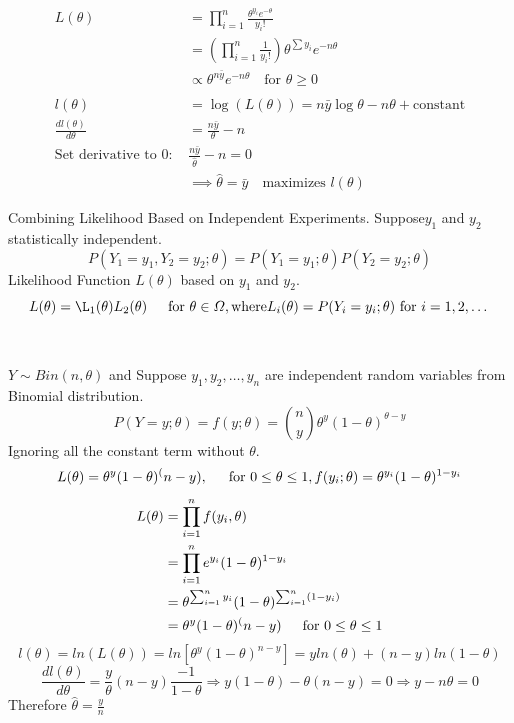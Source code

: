 \documentclass{article}
\begin{document}
\begin{align*}
    L(\theta) &= \prod_{i=1}^{n} \frac{\theta^{y_i} e^{-\theta}}{y_i!} \\
    &= \left( \prod_{i=1}^{n} \frac{1}{y_i!} \right) \theta^{\sum y_i} e^{-n\theta} \\
    &\propto \theta^{n\bar{y}} e^{-n\theta} \quad \text{for } \theta \ge 0 \\
    \\
    l(\theta) &= \log(L(\theta)) = n\bar{y}\log\theta - n\theta + \text{constant} \\
    \frac{d l(\theta)}{d\theta} &= \frac{n\bar{y}}{\theta} - n \\
    \text{Set derivative to 0: } & \frac{n\bar{y}}{\hat{\theta}} - n = 0 \\
    &\implies \hat{\theta} = \bar{y} \quad \text{maximizes } l(\theta)
\end{align*}

\noindent Combining Likelihood Based on Independent Experiments.
Suppose$y_1$ and $y_2$ statistically independent.
$$P(Y_1 = y_1, Y_2 = y_2; \theta) = P(Y_1 = y_1; \theta)P(Y_2 = y_2;\theta)$$
Likelihood Function  $L(\theta)$ based on $y_1$ and $y_2$.
$$L(\theta) = \L_1(\theta)L_2(\theta) \indent \text{for } \theta \in \varOmega, \text{where}L_i(\theta) = P(Y_i = y_i; \theta) \text{ for } i = 1, 2,\dotsc$$
\\\\
$Y\sim Bin(n, \theta)$ and Suppose $y_1, y_2, \dotsc, y_n$ are independent random variables from Binomial distribution.
$$P(Y=y; \theta) = f(y;\theta) = \binom{n}{y}\theta^y\left(1-\theta\right)^{\theta - y} $$
Ignoring all the constant term without $\theta$.
$$L(\theta) = \theta^y (1-\theta)^(n-y), \indent \text{for } 0\le \theta \le 1, f(y_i; \theta) = \theta^{y_i}(1-\theta)^{1-y_i}$$
\begin{align*}
    L(\theta)&= \prod_{i=1}^{n}f(y_i,\theta)\\
    &= \prod_{i=1}^{n}e^{y_i}(1-\theta)^{1-y_i}\\
    &= \theta^{\sum_{i=1}^{n}y_i}(1-\theta)^{\sum_{i=1}^{n} (1- y_i)}\\
    &= \theta^y (1 - \theta)^(n-y) \indent \text{for } 0\le \theta \le 1
\end{align*}
$$l(\theta) = ln(L(\theta)) = ln\left[\theta^y(1-\theta)^{n-y}\right] = yln(\theta) + (n-y)ln(1-\theta)$$
$$\frac{dl(\theta)}{d\theta} = \frac{y}{\theta} (n-y)\frac{-1}{1-\theta} \Rightarrow y(1-\theta) - \theta(n-y) = 0 \Rightarrow y -n\theta = 0$$
Therefore $\hat{\theta} = \frac{y}{n}$
\end{document}
